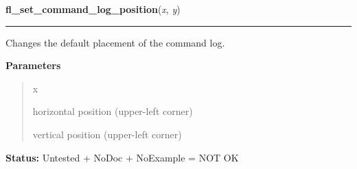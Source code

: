    \label{xformslib:library:fl_set_command_log_position}

    \vspace{0.5ex}

\hspace{.8\funcindent}\begin{boxedminipage}{\funcwidth}

    \raggedright \textbf{fl\_set\_command\_log\_position}(\textit{x}, \textit{y})

    \vspace{-1.5ex}

    \rule{\textwidth}{0.5\fboxrule}
\setlength{\parskip}{2ex}
    Changes the default placement of the command log.

\setlength{\parskip}{1ex}
      \textbf{Parameters}
      \vspace{-1ex}

      \begin{quote}
        \begin{Ventry}{x}

          \item[x]

          horizontal position (upper-left corner)

          \item[y]

          vertical position (upper-left corner)

        \end{Ventry}

      \end{quote}

\textbf{Status:} Untested + NoDoc + NoExample = NOT OK



    \end{boxedminipage}

    \label{xformslib:library:fl_get_command_log_fdstruct}

    \vspace{0.5ex}

